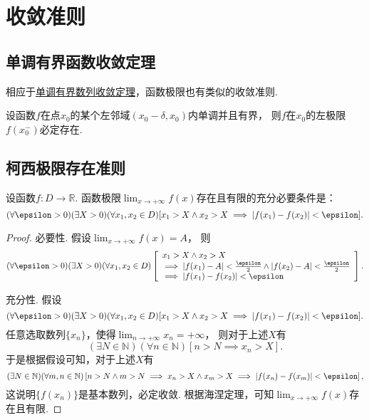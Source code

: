 \section{收敛准则}
\subsection{单调有界函数收敛定理}
相应于\hyperref[theorem:极限.数列的单调有界定理]{单调有界数列收敛定理}，函数极限也有类似的收敛准则.
\begin{theorem}\label{theorem:极限.函数的单调有界定理}
设函数\(f\)在点\(x_0\)的某个左邻域\((x_0-\delta,x_0)\)内单调并且有界，
则\(f\)在\(x_0\)的左极限\(f(x_0^-)\)必定存在.
\end{theorem}

\subsection{柯西极限存在准则}
\begin{theorem}\label{theorem:极限.函数的柯西极限存在准则}
设函数\(f\colon D\to\mathbb{R}\).
函数极限\(\lim_{x\to+\infty} f(x)\)存在且有限的充分必要条件是：\[
	(\forall\epsilon>0)
	(\exists X>0)
	(\forall x_1,x_2\in D)\\ \relax
	[
		x_1 > X \land x_2 > X
		\implies
		\abs{f(x_1) - f(x_2)} < \epsilon
	].
\]
\begin{proof}
必要性.
假设\(\lim_{x\to+\infty} f(x) = A\)，
则\[
	(\forall\epsilon>0)
	(\exists X>0)
	(\forall x_1,x_2\in D)
	\left[
		\begin{array}{l}
			x_1 > X \land x_2 > X \\
			\implies
			\abs{f(x_1) - A} < \frac\epsilon2
			\land
			\abs{f(x_2) - A} < \frac\epsilon2 \\
			\implies
			\abs{f(x_1) - f(x_2)} < \epsilon
		\end{array}
	\right].
\]

充分性.
假设\[
	(\forall\epsilon>0)
	(\exists X>0)
	(\forall x_1,x_2\in D)
	[
		x_1 > X \land x_2 > X
		\implies
		\abs{f(x_1) - f(x_2)} < \epsilon
	].
\]
任意选取数列\(\{x_n\}\)，使得\(\lim_{n\to+\infty} x_n = +\infty\)，
则对于上述\(X\)有\[
	(\exists N\in\mathbb{N})
	(\forall n\in\mathbb{N})
	[
		n > N
		\implies
		x_n > X
	].
\]
于是根据假设可知，对于上述\(X\)有\[
	(\exists N\in\mathbb{N})
	(\forall m,n\in\mathbb{N})
	\left[
		n > N \land m > N
		\implies
		x_n > X \land x_m > X
		\implies
		\abs{f(x_n) - f(x_m)} < \epsilon
	\right],
\]
这说明\(\{f(x_n)\}\)是基本数列，必定收敛.
根据海涅定理，可知\(\lim_{x\to+\infty} f(x)\)存在且有限.
\end{proof}
\end{theorem}
